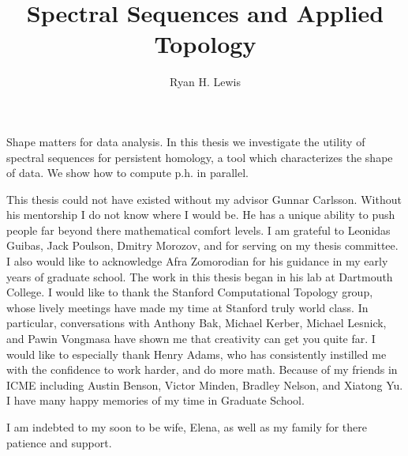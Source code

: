 \documentclass[12pt,twsoside]{report}
\title{Spectral Sequences and Applied Topology}
\author{Ryan H. Lewis}
\begin{document}
\maketitle

%
Shape matters for data analysis. In this thesis we investigate the utility of spectral sequences for persistent homology, a tool which characterizes the shape of data. We show how to compute p.h. in parallel. 


This thesis could not have existed without my advisor Gunnar Carlsson. Without his mentorship I do not know where I would be. He has a unique ability to push people far beyond there mathematical comfort levels. I am grateful to Leonidas Guibas, Jack Poulson, Dmitry Morozov, and  for serving on my thesis committee. I also would like to acknowledge Afra Zomorodian for his guidance in my early years of graduate school. The work in this thesis began in his lab at Dartmouth College. I would like to thank the Stanford Computational Topology group, whose lively meetings have made my time at Stanford truly world class. In particular, conversations with Anthony Bak, Michael Kerber, Michael Lesnick, and Pawin Vongmasa have shown me that creativity can get you quite far. I would like to especially thank Henry Adams, who has consistently instilled me with the confidence to work harder, and do more math. Because of my friends in ICME including Austin Benson, Victor Minden, Bradley Nelson, and Xiatong Yu. I have many happy memories of my time in Graduate School. 

I am indebted to my soon to be wife, Elena, as well as my family for there patience and support.

 \afterpreface
%





%
%
%




% 
\end{document}
